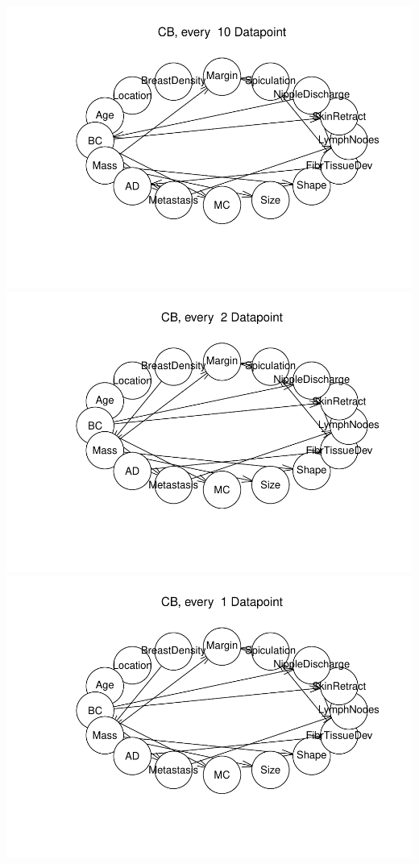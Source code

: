 \documentclass[]{article}
\begin{document}
\includegraphics{BN_Ass2_files/figure-latex/unnamed-chunk-3-1.pdf}
\includegraphics{BN_Ass2_files/figure-latex/unnamed-chunk-3-2.pdf}
\includegraphics{BN_Ass2_files/figure-latex/unnamed-chunk-3-3.pdf}
\end{document}

